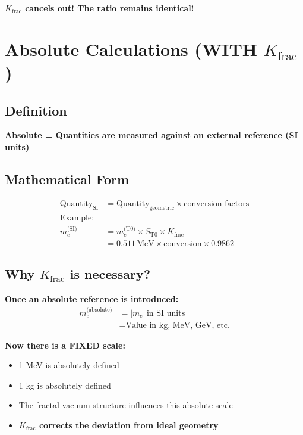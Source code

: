 \documentclass[12pt,a4paper]{article}
\begin{document}
	\textbf{$K_{\text{frac}}$ cancels out! The ratio remains identical!}
	
	\section{Absolute Calculations (WITH $K_{\text{frac}}$)}
	
	\subsection{Definition}
	
	\textbf{Absolute = Quantities are measured against an external reference (SI units)}
	
	\subsection{Mathematical Form}
	\begin{align*}
		\text{Quantity}_{\text{SI}} &= \text{Quantity}_{\text{geometric}} \times \text{conversion factors} \\
		\text{Example:} & \\
		m_e^{\text{(SI)}} &= m_e^{\text{(T0)}} \times S_{\text{T0}} \times K_{\text{frac}} \\
		&= 0.511\,\text{MeV} \times \text{conversion} \times 0.9862
	\end{align*}
	
	\subsection{Why $K_{\text{frac}}$ is necessary?}
	
	\textbf{Once an absolute reference is introduced:}
	\begin{align*}
		m_e^{\text{(absolute)}} &= |m_e|\,\text{in SI units} \\
		&= \text{Value in kg, MeV, GeV, etc.}
	\end{align*}
	
	\textbf{Now there is a FIXED scale:}
	\begin{itemize}
		\item 1 MeV is absolutely defined
		\item 1 kg is absolutely defined  
		\item The fractal vacuum structure influences this absolute scale
		\item \textbf{$K_{\text{frac}}$ corrects the deviation from ideal geometry}
	\end{itemize}
	
\end{document}
